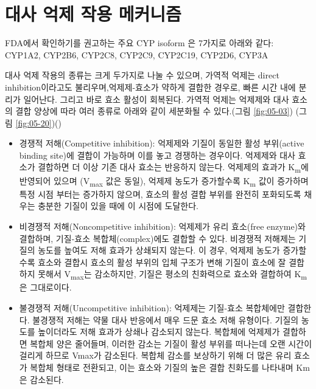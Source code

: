 \documentclass[
  11pt,
  krantz2, a4paper, twoside]{krantz}
\providecommand{\tightlist}{%
  \setlength{\itemsep}{0pt}\setlength{\parskip}{0pt}}
\begin{document}
\section{대사 억제 작용 메커니즘}\label{uxb300uxc0ac-uxc5b5uxc81c-uxc791uxc6a9-uxba54uxcee4uxb2c8uxc998}

FDA에서 확인하기를 권고하는 주요 CYP isoform 은 7가지로 아래와 같다:
CYP1A2, CYP2B6, CYP2C8, CYP2C9, CYP2C19, CYP2D6, CYP3A

대사 억제 작용의 종류는 크게 두가지로 나눌 수 있으며, 가역적 억제는
direct inhibition이라고도 불리우며,억제제-효소가 약하게 결합한 경우로,
빠른 시간 내에 분리가 일어난다. 그리고 바로 효소 활성이 회복된다. 가역적
억제는 억제제와 대사 효소의 결합 양상에 따라 여러 종류로 아래와 같이
세분화될 수 있다.(그림 \ref{fig:05-03}) (그림
\ref{fig:05-20})()

\begin{itemize}
\tightlist
\item
  경쟁적 저해(Competitive inhibition): 억제제와 기질이 동일한 활성
  부위(active binding site)에 결합이 가능하며 이를 놓고 경쟁하는
  경우이다. 억제제와 대사 효소가 결합하면 더 이상 기존 대사 효소는
  반응하지 않는다. 억제제의 효과가 K\textsubscript{m}에 반영되어 있으며 (V\textsubscript{max} 값은
  동일), 억제제 농도가 증가할수록 K\textsubscript{m} 값이 증가하며 특정 시점 부터는
  증가하지 않으며, 효소의 활성 결합 부위를 완전히 포화되도록 채우는
  충분한 기질이 있을 때에 이 시점에 도달한다.
\item
  비경쟁적 저해(Noncompetitive inhibition): 억제제가 유리 효소(free
  enzyme)와 결합하며, 기질-효소 복합체(complex)에도 결합할 수 있다.
  비경쟁적 저해제는 기질의 농도를 높여도 저해 효과가 상쇄되지 않는다.
  이 경우, 억제제 농도가 증가할수록 효소와 결합시 효소의 활성 부위의
  입체 구조가 변해 기질이 효소에 잘 결합하지 못해서 V\textsubscript{max}는
  감소하지만, 기질은 평소의 친화력으로 효소와 결합하여 K\textsubscript{m} 은
  그대로이다.
\item
  불경쟁적 저해(Uncompetitive inhibition): 억제제는 기질-효소
  복합체에만 결합한다. 불경쟁적 저해는 약물 대사 반응에서 매우 드문
  효소 저해 유형이다. 기질의 농도를 높이더라도 저해 효과가 상쇄나
  감소되지 않는다. 복합체에 억제제가 결합하면 복합체 양은 줄어들며,
  이러한 감소는 기질이 활성 부위를 떠나는데 오랜 시간이 걸리게 하므로
  Vmax가 감소된다. 복합체 감소를 보상하기 위해 더 많은 유리 효소가
  복합체 형태로 전환되고, 이는 효소와 기질의 높은 결합 친화도를
  나타내며 Km은 감소된다.
\end{itemize}
\end{document}
